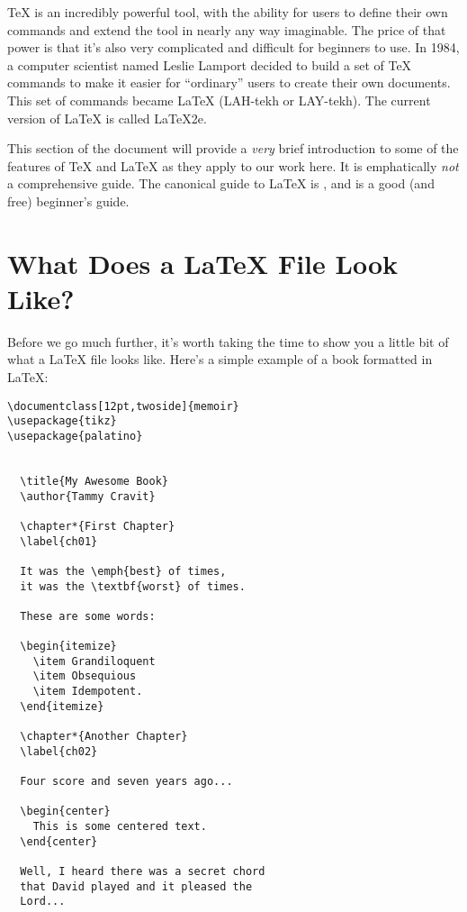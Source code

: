 \TeX{} is an incredibly powerful tool, with the ability for users to define
their own commands and extend the tool in nearly any way imaginable. The price
of that power is that it's also very complicated and difficult for beginners
to use. In 1984, a computer scientist named Leslie Lamport decided to build a
set of \TeX{} commands to make it easier for ``ordinary'' users to create their
own documents. This set of commands became \LaTeX{} (LAH-tekh or LAY-tekh). The
current version of \LaTeX{} is called \LaTeX2e{}.

This section of the document will provide a \emph{very} brief introduction to
some of the features of \TeX{} and \LaTeX{} as they apply to our work here. It is
emphatically \emph{not} a comprehensive guide. The canonical guide to \LaTeX
is \cite{latex2e}, and \cite{lshort} is a good (and free) beginner's guide.

\section{What Does a LaTeX File Look Like?} \label{sec:example}

Before we go much further, it's worth taking the time to show you a little bit
of what a \LaTeX{} file looks like. Here's a simple example of a book formatted
in \LaTeX:

\begin{lstlisting}
\documentclass[12pt,twoside]{memoir}
\usepackage{tikz}
\usepackage{palatino}


  \title{My Awesome Book} 
  \author{Tammy Cravit}
        
  \chapter*{First Chapter} 
  \label{ch01}

  It was the \emph{best} of times, 
  it was the \textbf{worst} of times.

  These are some words:

  \begin{itemize}
    \item Grandiloquent
    \item Obsequious
    \item Idempotent.
  \end{itemize}

  \chapter*{Another Chapter} 
  \label{ch02}

  Four score and seven years ago...

  \begin{center}
    This is some centered text.
  \end{center}

  Well, I heard there was a secret chord 
  that David played and it pleased the
  Lord...

\end{lstlisting}

